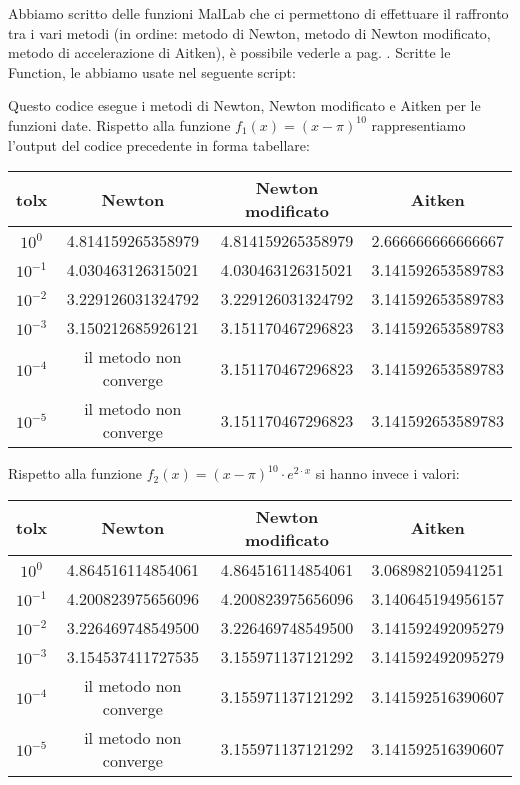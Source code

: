\begin{flushleft}
Abbiamo scritto delle funzioni MalLab che ci permettono di effettuare il raffronto tra i vari metodi (in ordine: metodo di Newton, metodo di Newton modificato, metodo di accelerazione di Aitken), è possibile vederle a pag. \pageref{functcap2}. Scritte le Function, le abbiamo usate nel seguente script: 

Questo codice esegue i metodi di Newton, Newton modificato e Aitken per le funzioni date. Rispetto alla funzione $f_1(x)=(x-\pi)^{10}$ rappresentiamo l'output del codice precedente in forma tabellare: 
\begin{center}
\begin{tabular}{|c|c|c|c|}
\hline
tolx & Newton & Newton modificato & Aitken \\
\hline
$10^{0}$ & 4.814159265358979 & 4.814159265358979 & 2.666666666666667 \\
$10^{-1}$ & 4.030463126315021 & 4.030463126315021 & 3.141592653589783 \\
$10^{-2}$ & 3.229126031324792 & 3.229126031324792 & 3.141592653589783 \\
$10^{-3}$ & 3.150212685926121 & 3.151170467296823 &  3.141592653589783 \\ 
$10^{-4}$ & il metodo non converge & 3.151170467296823 & 3.141592653589783 \\
$10^{-5}$ & il metodo non converge & 3.151170467296823 & 3.141592653589783 \\
\hline
\end{tabular}
\end{center}
Rispetto alla funzione $f_2(x) = (x-\pi)^{10} \cdot e^{2\cdot x}$ si hanno invece i valori:
\begin{center}
\begin{tabular}{|c|c|c|c|}
\hline
tolx & Newton & Newton modificato & Aitken \\
\hline
$10^{0}$ & 4.864516114854061 & 4.864516114854061 & 3.068982105941251 \\
$10^{-1}$ & 4.200823975656096 & 4.200823975656096 & 3.140645194956157 \\
$10^{-2}$ & 3.226469748549500 & 3.226469748549500 & 3.141592492095279 \\
$10^{-3}$ & 3.154537411727535 & 3.155971137121292 &  3.141592492095279 \\ 
$10^{-4}$ & il metodo non converge & 3.155971137121292 & 3.141592516390607 \\
$10^{-5}$ & il metodo non converge & 3.155971137121292 & 3.141592516390607 \\
\hline
\end{tabular}
\end{center}
\end{flushleft}